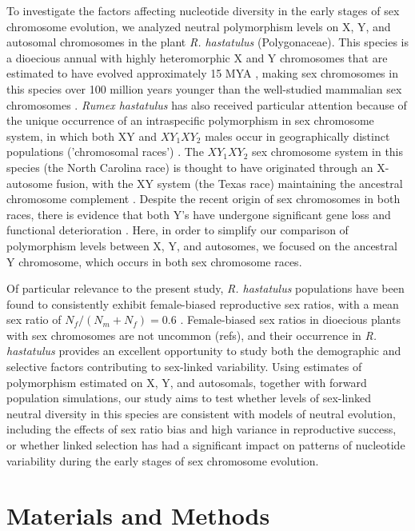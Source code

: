 \documentclass[9pt,twocolumn,twoside]{gsajnl}
\begin{document}
To investigate the factors affecting nucleotide diversity in the early stages of sex chromosome evolution, we analyzed neutral polymorphism levels on X, Y, and autosomal chromosomes in the plant \textit{R. hastatulus }(Polygonaceae). This species is a dioecious annual with highly heteromorphic X and Y chromosomes that are estimated to have evolved  approximately 15 MYA \citep{quesada2011,grabowska2015,navajas2005}, making sex chromosomes in this species over 100 million years younger than the well-studied mammalian sex chromosomes \citep{lahn1999,ross2005dna}. \textit{Rumex hastatulus} has also received particular attention because of the unique occurrence of an intraspecific polymorphism in sex chromosome system, in which both XY and $XY_{1}XY_{2}$ males occur in geographically distinct populations ('chromosomal races') \citep{smith1963mechanism}. The $XY_{1}XY_{2}$ sex chromosome system in this species (the North Carolina race) is thought to have originated through an X-autosome fusion, with the XY system (the Texas race) maintaining the ancestral chromosome complement \citep{smith1964evolving}. Despite the recent origin of sex chromosomes in both races, there is evidence that both Y's have undergone significant gene loss and functional deterioration \citep{hough2014}. Here, in order to simplify our comparison of polymorphism levels between X, Y, and autosomes, we focused on the ancestral Y chromosome, which occurs in both sex chromosome races.

Of particular relevance to the present study, \textit{R. hastatulus} populations have been found to consistently exhibit female-biased reproductive sex ratios, with a mean sex ratio of $N_{f}/(N_{m}+N_{f})=0.6$ \citep{pickup2013influence}. Female-biased sex ratios in dioecious plants with sex chromosomes are not uncommon (refs), and their occurrence in \textit{R. hastatulus} provides an excellent opportunity to study both the demographic and selective factors contributing to sex-linked variability. Using estimates of polymorphism estimated on X, Y, and autosomals, together with forward population simulations, our study aims to test whether levels of sex-linked neutral diversity in this species are consistent with models of neutral evolution, including the effects of sex ratio bias and high variance in reproductive success, or whether linked selection has had a significant impact on patterns of nucleotide variability during the early stages of sex chromosome evolution. 

\section*{Materials and Methods}
\end{document}
